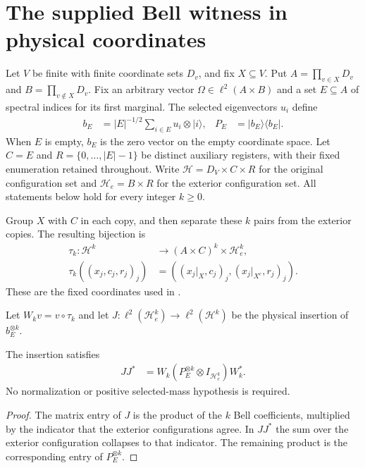 \section{The supplied Bell witness in physical coordinates}

Let $V$ be finite with finite coordinate sets $D_v$, and fix $X\subseteq V$.
Put $A=\prod_{v\in X}D_v$ and $B=\prod_{v\notin X}D_v$.
Fix an arbitrary vector $\Omega\in\ell^2(A\times B)$ and a set $E\subseteq A$
of spectral indices for its first marginal. The selected eigenvectors $u_i$
define
\begin{align*}
    b_E&=|E|^{-1/2}\sum_{i\in E}u_i\otimes|i\rangle,
    &P_E&=|b_E\rangle\langle b_E|.
\end{align*}
When $E$ is empty, $b_E$ is the zero vector on the empty coordinate space.
Let $C=E$ and $R=\{0,\ldots,|E|-1\}$ be distinct auxiliary registers,
with their fixed enumeration retained throughout.
Write $\mathcal H=D_V\times C\times R$ for the original configuration set
and $\mathcal H_e=B\times R$ for the exterior configuration set.
All statements below hold for every integer $k\geq0$.

\begin{definition}
    \label{def:schmidt_bell_witness_coordinates}
    \leanok
    Group $X$ with $C$ in each copy, and then separate these $k$ pairs
    from the exterior copies. The resulting bijection is
    \begin{align*}
        \tau_k:\mathcal H^k&\longrightarrow(A\times C)^k\times\mathcal H_e^k,\\
        \tau_k((x_j,c_j,r_j)_j)&=((x_j|_X,c_j)_j,(x_j|_{X^c},r_j)_j).
    \end{align*}
    These are the fixed coordinates used in
    \cite[Section~8, lines~240--254 and~283--290]{OpenAI2026AreaLaw}.
\end{definition}

Let $W_kv=v\circ\tau_k$ and let
$J:\ell^2(\mathcal H_e^k)\to\ell^2(\mathcal H^k)$ be the physical insertion
of $b_E^{\otimes k}$.

\begin{theorem}
    \label{thm:schmidt_bell_witness_outer_product}
    \leanok
    The insertion satisfies
    \begin{align*}
        JJ^*&=W_k(P_E^{\otimes k}\otimes I_{\mathcal H_e^k})W_k^*.
    \end{align*}
    No normalization or positive selected-mass hypothesis is required.
\end{theorem}
\begin{proof}\leanok
    The matrix entry of $J$ is the product of the $k$ Bell coefficients,
    multiplied by the indicator that the exterior configurations agree.
    In $JJ^*$ the sum over the exterior configuration collapses to that
    indicator. The remaining product is the corresponding entry of
    $P_E^{\otimes k}$.
\end{proof}

